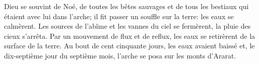 Dieu se souvint de Noé,
	de toutes les bêtes sauvages et de tous les bestiaux
		qui étaient avec lui dans l’arche;
	il fit passer un souffle sur la terre: les eaux se calmèrent.
Les sources de l’abîme et les vannes du ciel se fermèrent,
	la pluie des cieux s’arrêta.
Par un mouvement de flux et de reflux,
	les eaux se retirèrent de la surface de la terre.
Au bout de cent cinquante jours, les eaux avaient baissé
	et, le dix-septième jour du septième mois,
	l’arche se posa sur les monts d’Ararat.
